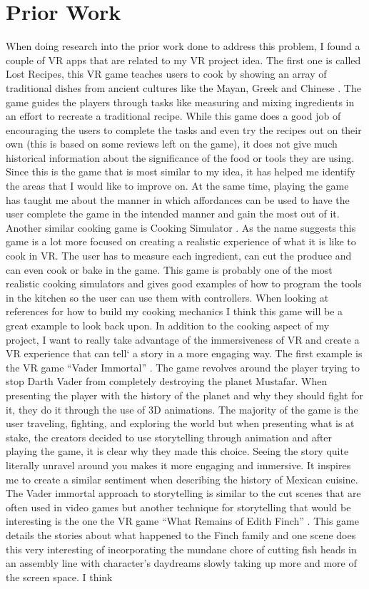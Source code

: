 \documentclass[12pt,twocolumn]{article}
\begin{document}
\section{Prior Work}
When doing research into the prior work done to address this problem, I found a couple of VR apps that are related to my VR project idea. The first one is called Lost Recipes, this VR game teaches users to cook by showing an array of traditional dishes from ancient cultures like the Mayan, Greek and Chinese \cite{lostrecipes2022}. The game guides the players through tasks like measuring and mixing ingredients in an effort to recreate a traditional recipe. While this game does a good job of encouraging the users to complete the tasks and even try the recipes out on their own (this is based on some reviews left on the game), it does not give much historical information about the significance of the food or tools they are using. Since this is the game that is most similar to my idea, it has helped me identify the areas that I would like to improve on. At the same time, playing the game has taught me about the manner in which affordances can be used to have the user complete the game in the intended manner and gain the most out of it. Another similar cooking game is Cooking Simulator \cite{cookingsim2019}. As the name suggests this game is a lot more focused on creating a realistic experience of what it is like to cook in VR. The user has to measure each ingredient, can cut the produce and can even cook or bake in the game. This game is probably one of the most realistic cooking simulators and gives good examples of how to program the tools in the kitchen so the user can use them with controllers. When looking at references for how to build my cooking mechanics I think this game will be a great example to look back upon. In addition to the cooking aspect of my project, I want to really take advantage of the immersiveness of VR and create a VR experience that can tell` a story in a more engaging way. The first example is the VR game “Vader Immortal” \cite{vadarimmortal2019ep1}. The game revolves around the player trying to stop Darth Vader from completely destroying the planet Mustafar. When presenting the player with the history of the planet and why they should fight for it, they do it through the use of 3D animations. The majority of the game is the user traveling, fighting, and exploring the world but when presenting what is at stake, the creators decided to use storytelling through animation and after playing the game, it is clear why they made this choice. Seeing the story quite literally unravel around you makes it more engaging and immersive. It inspires me to create a similar sentiment when describing the history of Mexican cuisine. The Vader immortal approach to storytelling is similar to the cut scenes that are often used in video games but another technique for storytelling that would be interesting is the one the VR game “What Remains of Edith Finch” \cite{finch2019}. This game details the stories about what happened to the Finch family and one scene does this very interesting of incorporating the mundane chore of cutting fish heads in an assembly line with character’s daydreams slowly taking up more and more of the screen space. I think 
\end{document}
